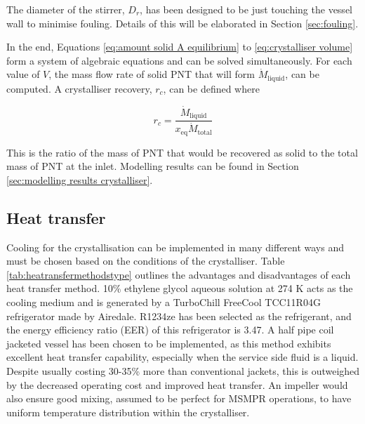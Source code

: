 \noindent The diameter of the stirrer, $D_r$, has been designed to be just touching the vessel wall to minimise fouling. Details of this will be elaborated in Section \ref{sec:fouling}.

In the end, Equations \ref{eq:amount solid A equilibrium} to \ref{eq:crystalliser volume} form a system of algebraic equations and can be solved simultaneously. For each value of $V$, the mass flow rate of solid PNT that will form $\dot{M}_{\mathrm{liquid}}$, can be computed. A crystalliser recovery, $r_c$, can be defined where

\begin{equation}
    r_c = \frac{\dot{M}_{\mathrm{liquid}}}{x_{\mathrm{eq}} \dot{M}_{\mathrm{total}}}
\end{equation}

\noindent This is the ratio of the mass of PNT that would be recovered as solid to the total mass of PNT at the inlet. Modelling results can be found in Section \ref{sec:modelling results crystalliser}.

\subsection{Heat transfer}\label{sec:heat transfer crystalliser}

Cooling for the crystallisation can be implemented in many different ways and must be chosen based on the conditions of the crystalliser. Table \ref{tab:heatransfermethodstype} outlines the advantages and disadvantages of each heat transfer method. 10\% ethylene glycol aqueous solution at 274 K acts as the cooling medium and is generated by a TurboChill FreeCool TCC11R04G refrigerator made by Airedale. R1234ze has been selected as the refrigerant, and the energy efficiency ratio (EER) of this refrigerator is 3.47. A half pipe coil jacketed vessel has been chosen to be implemented, as this method exhibits excellent heat transfer capability, especially when the service side fluid is a liquid. Despite usually costing 30-35\% more than conventional jackets, this is outweighed by the decreased operating cost and improved heat transfer. An impeller would also ensure good mixing, assumed to be perfect for MSMPR operations, to have uniform temperature distribution within the crystalliser. 

